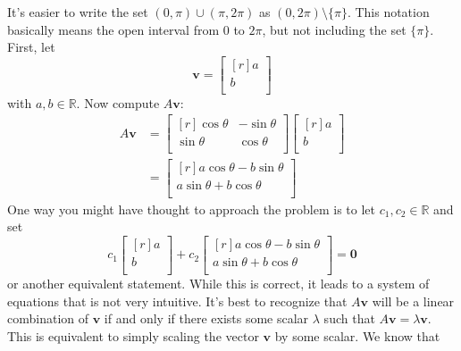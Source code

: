 \documentclass[12pt, letterpaper]{article}
\begin{document}
\begin{solution}
    It's easier to write the set \((0,\pi )\cup (\pi ,2\pi )\) as \((0,2\pi )\setminus\{ \pi  \} \). This notation basically means the open interval from \(0\) to \(2\pi \), but not including the set \(\{ \pi  \}  \). First, let
    \[
        \mathbf{v}= \begin{bmatrix}[r]
             a \\
             b \\
        \end{bmatrix}
    \]
    with \(a,b\in\mathbb{R}\). Now compute \(A \mathbf{v}\):
    \begin{align*}
        A \mathbf{v}&= \begin{bmatrix}[r]
            \cos \theta  &-\sin \theta    \\
             \sin \theta &\cos \theta    \\
        \end{bmatrix} \begin{bmatrix}[r]
             a \\
             b \\
        \end{bmatrix}\\
        &=\begin{bmatrix}[r]
             a \cos \theta -b \sin \theta  \\
              a \sin \theta +b\cos \theta \\
        \end{bmatrix}
    \end{align*}
    One way you might have thought to approach the problem is to let \(c_1,c_2\in\mathbb{R}\) and set 
    \[
        c_1 \begin{bmatrix}[r]
             a \\
              b\\
        \end{bmatrix} +c_2 \begin{bmatrix}[r]
             a \cos \theta -b\sin \theta  \\
              a \sin \theta +b\cos \theta \\
        \end{bmatrix}=\mathbf{0}
    \]
    or another equivalent statement. While this is correct, it leads to a system of equations that is not very intuitive. It's best to recognize that \(A \mathbf{v}\) will be a linear combination of \(\mathbf{v}\) if and only if there exists some scalar \(\lambda \) such that \(A \mathbf{v}=\lambda \mathbf{v}\). This is equivalent to simply scaling the vector \(\mathbf{v}\) by some scalar. We know that 

\end{solution}
\end{document}
